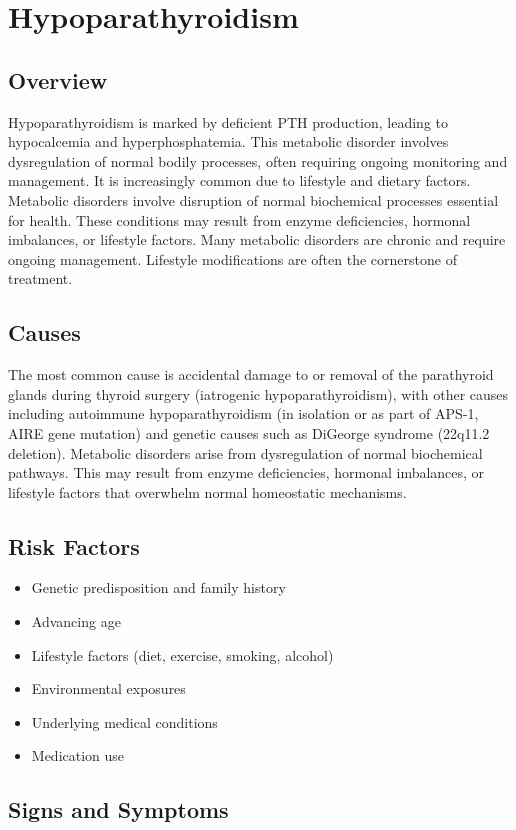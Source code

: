 \chapter{Hypoparathyroidism}
\label{sec:Hypoparathyroidism}

\section{Overview}
Hypoparathyroidism is marked by deficient PTH production, leading to hypocalcemia and hyperphosphatemia. This metabolic disorder involves dysregulation of normal bodily processes, often requiring ongoing monitoring and management. It is increasingly common due to lifestyle and dietary factors. Metabolic disorders involve disruption of normal biochemical processes essential for health. These conditions may result from enzyme deficiencies, hormonal imbalances, or lifestyle factors. Many metabolic disorders are chronic and require ongoing management. Lifestyle modifications are often the cornerstone of treatment.
\section{Causes}
The most common cause is accidental damage to or removal of the parathyroid glands during thyroid surgery (iatrogenic hypoparathyroidism), with other causes including autoimmune hypoparathyroidism (in isolation or as part of APS-1, AIRE gene mutation) and genetic causes such as DiGeorge syndrome (22q11.2 deletion). Metabolic disorders arise from dysregulation of normal biochemical pathways. This may result from enzyme deficiencies, hormonal imbalances, or lifestyle factors that overwhelm normal homeostatic mechanisms.   
\section{Risk Factors}
\begin{itemize}[noitemsep]
  \item Genetic predisposition and family history
  \item Advancing age
  \item Lifestyle factors (diet, exercise, smoking, alcohol)
  \item Environmental exposures
  \item Underlying medical conditions
  \item Medication use
\end{itemize}
\section{Signs and Symptoms}
